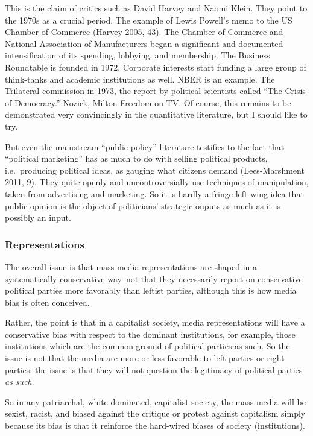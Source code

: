 \documentclass[12pt,book]{article}
\begin{document}
This is the claim of critics such as David Harvey and Naomi Klein. They
point to the 1970s as a crucial period. The example of Lewis Powell's
memo to the US Chamber of Commerce (Harvey 2005, 43). The Chamber of
Commerce and National Association of Manufacturers began a significant
and documented intensification of its spending, lobbying, and
membership. The Business Roundtable is founded in 1972. Corporate
interests start funding a large group of think-tanks and academic
institutions as well. NBER is an example. The Trilateral commission in
1973, the report by political scientists called ``The Crisis of
Democracy.'' Nozick, Milton Freedom on TV. Of course, this remains to be
demonstrated very convincingly in the quantitative literature, but I
should like to try.

But even the mainstream ``public policy'' literature testifies to the
fact that ``political marketing'' has as much to do with selling
political products, i.e.~producing political ideas, as gauging what
citizens demand (Lees-Marshment 2011, 9). They quite openly and
uncontroversially use techniques of manipulation, taken from advertising
and marketing. So it is hardly a fringe left-wing idea that public
opinion is the object of politicians' strategic ouputs as much as it is
possibly an input.

\subsubsection{Representations}\label{representations}

The overall issue is that mass media representations are shaped in a
systematically conservative way--not that they necessarily report on
conservative political parties more favorably than leftist parties,
although this is how media bias is often conceived.

Rather, the point is that in a capitalist society, media representations
will have a conservative bias with respect to the dominant institutions,
for example, those institutions which are the common ground of political
parties as such. So the issue is not that the media are more or less
favorable to left parties or right parties; the issue is that they will
not question the legitimacy of political parties \emph{as such}.

So in any patriarchal, white-dominated, capitalist society, the mass
media will be sexist, racist, and biased against the critique or protest
against capitalism simply because its bias is that it reinforce the
hard-wired biases of society (institutions).
\end{document}

